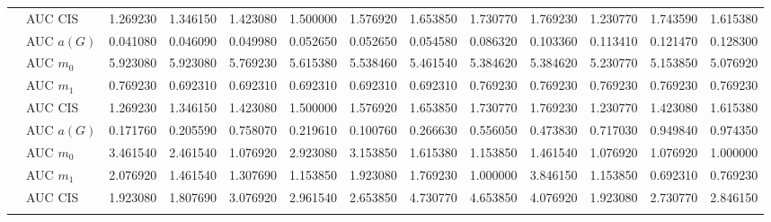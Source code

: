 \begin{table}[htbp]
\begin{tabular}{llrrrrrrrrrrr}
    & AUC CIS & 1.269230 & 1.346150 & 1.423080 & 1.500000 & 1.576920 & 1.653850 & 1.730770 & 1.769230 & 1.230770 & 1.743590 & 1.615380 \\
    \addlinespace
    \multirow{4}{*}{degree} & AUC $a(G)$ & 0.041080 & 0.046090 & 0.049980 & 0.052650 & 0.052650 & 0.054580 & 0.086320 & 0.103360 & 0.113410 & 0.121470 & 0.128300 \\
    & AUC $m_0$ & 5.923080 & 5.923080 & 5.769230 & 5.615380 & 5.538460 & 5.461540 & 5.384620 & 5.384620 & 5.230770 & 5.153850 & 5.076920 \\
    & AUC $m_1$ & 0.769230 & 0.692310 & 0.692310 & 0.692310 & 0.692310 & 0.692310 & 0.769230 & 0.769230 & 0.769230 & 0.769230 & 0.769230 \\
    & AUC CIS & 1.269230 & 1.346150 & 1.423080 & 1.500000 & 1.576920 & 1.653850 & 1.730770 & 1.769230 & 1.230770 & 1.423080 & 1.615380 \\
    \addlinespace
    \multirow{4}{*}{random} & AUC $a(G)$ & 0.171760 & 0.205590 & 0.758070 & 0.219610 & 0.100760 & 0.266630 & 0.556050 & 0.473830 & 0.717030 & 0.949840 & 0.974350 \\
    & AUC $m_0$ & 3.461540 & 2.461540 & 1.076920 & 2.923080 & 3.153850 & 1.615380 & 1.153850 & 1.461540 & 1.076920 & 1.076920 & 1.000000 \\
    & AUC $m_1$ & 2.076920 & 1.461540 & 1.307690 & 1.153850 & 1.923080 & 1.769230 & 1.000000 & 3.846150 & 1.153850 & 0.692310 & 0.769230 \\
    & AUC CIS & 1.923080 & 1.807690 & 3.076920 & 2.961540 & 2.653850 & 4.730770 & 4.653850 & 4.076920 & 1.923080 & 2.730770 & 2.846150 \\
    \addlinespace
    \bottomrule
  \end{tabular}
\end{table}

